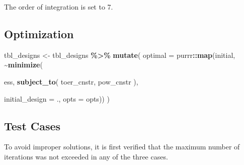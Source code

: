 \documentclass[
]{book}
\newenvironment{Shaded}{\begin{snugshade}}{\end{snugshade}}
\newcommand{\DataTypeTok}[1]{\textcolor[rgb]{0.13,0.29,0.53}{#1}}
\newcommand{\KeywordTok}[1]{\textcolor[rgb]{0.13,0.29,0.53}{\textbf{#1}}}
\newcommand{\NormalTok}[1]{#1}
\newcommand{\OperatorTok}[1]{\textcolor[rgb]{0.81,0.36,0.00}{\textbf{#1}}}
\newcommand{\StringTok}[1]{\textcolor[rgb]{0.31,0.60,0.02}{#1}}
\begin{document}
The order of integration is set to 7.

\hypertarget{optimization}{%
\subsection{Optimization}\label{optimization}}

\begin{Shaded}
\begin{Highlighting}[]
\NormalTok{tbl\_designs \textless{}{-}}\StringTok{ }\NormalTok{tbl\_designs }\OperatorTok{\%\textgreater{}\%}\StringTok{ }
\StringTok{    }\KeywordTok{mutate}\NormalTok{(}
       \DataTypeTok{optimal =}\NormalTok{ purrr}\OperatorTok{::}\KeywordTok{map}\NormalTok{(initial, }\OperatorTok{\textasciitilde{}}\KeywordTok{minimize}\NormalTok{(}
         
\NormalTok{          ess,}
          \KeywordTok{subject\_to}\NormalTok{(}
\NormalTok{              toer\_cnstr,}
\NormalTok{              pow\_cnstr}
\NormalTok{          ),}
          
          \DataTypeTok{initial\_design =}\NormalTok{ ., }
          \DataTypeTok{opts           =}\NormalTok{ opts)) )}
\end{Highlighting}
\end{Shaded}

\hypertarget{test-cases}{%
\subsection{Test Cases}\label{test-cases}}

To avoid improper solutions, it is first verified that the maximum
number of iterations was not exceeded in any of the three cases.

\begin{Shaded}
\end{Shaded}
\end{document}
